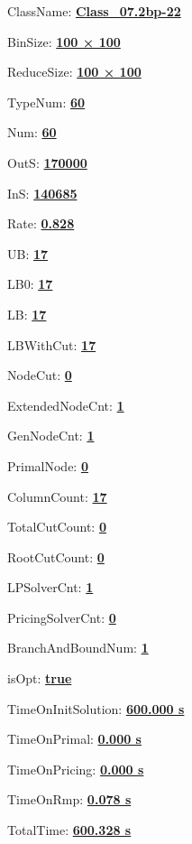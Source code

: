 \documentclass[11pt]{article}
\begin{document}
\pagestyle{empty}


ClassName: \underline{\textbf{Class_07.2bp-22}}
\par
BinSize: \underline{\textbf{100 × 100}}
\par
ReduceSize: \underline{\textbf{100 × 100}}
\par
TypeNum: \underline{\textbf{60}}
\par
Num: \underline{\textbf{60}}
\par
OutS: \underline{\textbf{170000}}
\par
InS: \underline{\textbf{140685}}
\par
Rate: \underline{\textbf{0.828}}
\par
UB: \underline{\textbf{17}}
\par
LB0: \underline{\textbf{17}}
\par
LB: \underline{\textbf{17}}
\par
LBWithCut: \underline{\textbf{17}}
\par
NodeCut: \underline{\textbf{0}}
\par
ExtendedNodeCnt: \underline{\textbf{1}}
\par
GenNodeCnt: \underline{\textbf{1}}
\par
PrimalNode: \underline{\textbf{0}}
\par
ColumnCount: \underline{\textbf{17}}
\par
TotalCutCount: \underline{\textbf{0}}
\par
RootCutCount: \underline{\textbf{0}}
\par
LPSolverCnt: \underline{\textbf{1}}
\par
PricingSolverCnt: \underline{\textbf{0}}
\par
BranchAndBoundNum: \underline{\textbf{1}}
\par
isOpt: \underline{\textbf{true}}
\par
TimeOnInitSolution: \underline{\textbf{600.000 s}}
\par
TimeOnPrimal: \underline{\textbf{0.000 s}}
\par
TimeOnPricing: \underline{\textbf{0.000 s}}
\par
TimeOnRmp: \underline{\textbf{0.078 s}}
\par
TotalTime: \underline{\textbf{600.328 s}}
\par
\newpage


\end{document}
